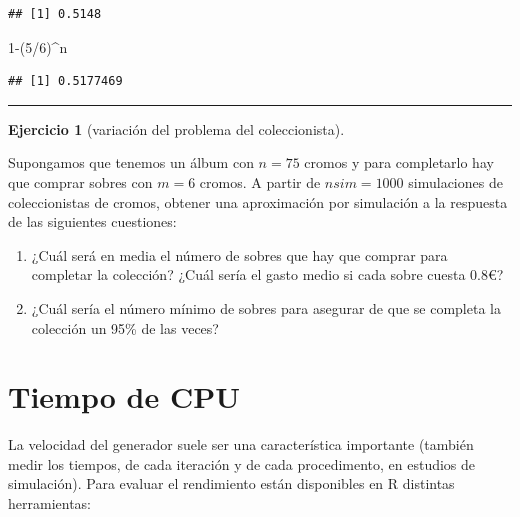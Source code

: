 \documentclass[
]{book}
\newenvironment{Shaded}{\begin{snugshade}}{\end{snugshade}}
\newcommand{\DecValTok}[1]{\textcolor[rgb]{0.00,0.00,0.81}{#1}}
\newcommand{\NormalTok}[1]{#1}
\newcommand{\SpecialCharTok}[1]{\textcolor[rgb]{0.00,0.00,0.00}{#1}}
\theoremstyle{break}
\theoremstyle{definition}
\theoremstyle{definition}
\theoremstyle{definition}
\newtheorem{exercise}{Ejercicio}[chapter]
\theoremstyle{definition}
\theoremstyle{remark}
\begin{document}
\begin{enumerate}
\begin{verbatim}
## [1] 0.5148
\end{verbatim}

\begin{Shaded}
\begin{Highlighting}[]
\DecValTok{1}\SpecialCharTok{{-}}\NormalTok{(}\DecValTok{5}\SpecialCharTok{/}\DecValTok{6}\NormalTok{)}\SpecialCharTok{\^{}}\NormalTok{n}
\end{Highlighting}
\end{Shaded}

\begin{verbatim}
## [1] 0.5177469
\end{verbatim}
\end{enumerate}

\begin{center}\rule{0.5\linewidth}{0.5pt}\end{center}

\begin{exercise}[variación del problema del coleccionista]
\protect\hypertarget{exr:album}{}{\label{exr:album} {} }
\end{exercise}

Supongamos que tenemos un álbum con \(n = 75\) cromos y para completarlo hay que comprar sobres con \(m = 6\) cromos. A partir de \(nsim=1000\) simulaciones de coleccionistas de cromos, obtener una aproximación por simulación a la respuesta de las siguientes cuestiones:

\begin{enumerate}
\def\labelenumi{\alph{enumi})}
\item
  ¿Cuál será en media el número de sobres que hay que comprar para completar la colección?
  ¿Cuál sería el gasto medio si cada sobre cuesta 0.8€?
\item
  ¿Cuál sería el número mínimo de sobres para asegurar de que se completa la colección un 95\% de las veces?
\end{enumerate}

\hypertarget{tiempo-de-cpu}{%
\section{Tiempo de CPU}\label{tiempo-de-cpu}}

La velocidad del generador suele ser una característica importante (también medir los tiempos, de cada iteración y de cada procedimento, en estudios de simulación).
Para evaluar el rendimiento están disponibles en R distintas herramientas:
\end{document}
